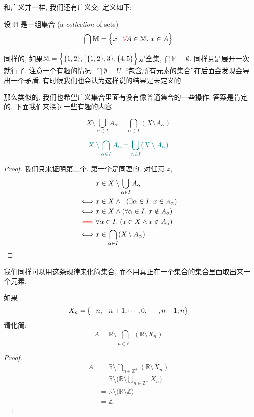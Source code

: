 和广义并一样, 我们还有广义交. 定义如下: 
\begin{definition}
  设 $\mathbb{M}$ 是一组集合 (a {\it collection} of sets)
  \[
    \bigcap \mathbb{M} = \Big\{x \mid \textcolor{red}{\forall} A \in \mathbb{M}.\; x \in A\Big\}
  \]
\end{definition}

同样的, 如果$\mathbb{M} = \Big\{\{1, 2\}, \{\{1, 2\}, 3\}, \{4, 5\}\Big\}$是全集,  $\bigcap \mathbb{M} = \emptyset$. 同样只是展开一次就行了. 注意一个有趣的情况: $\bigcap \emptyset =U$. ``包含所有元素的集合''在后面会发现会导出一个矛盾, 有时候我们也会认为这样说的结果是未定义的. 

那么类似的, 我们也希望广义集合里面有没有像普通集合的一些操作. 答案是肯定的. 下面我们来探讨一些有趣的内容. 

\begin{theorem}[德摩根律]
  \[
    X \setminus \bigcup_{\alpha \in I} A_{\alpha} = \bigcap_{\alpha \in I} (X \setminus A_{\alpha})
  \]

  \[
    \textcolor{teal}{X \setminus \bigcap_{\alpha \in I} A_{\alpha} = \bigcup_{\alpha \in I} (X \setminus A_{\alpha})}
  \]
\end{theorem}

\begin{proof}
  我们只来证明第二个. 第一个是同理的. 对任意 $x$,
  \setcounter{equation}{0}
  \begin{align*}
    &x \in X \setminus \bigcup_{\alpha \in I} A_{\alpha} \\
    \iff & x \in X \land \lnot(\exists \alpha \in I.\; x \in A_{\alpha}) \\
    \iff & x \in X \land (\forall \alpha \in I.\; x \notin A_{\alpha}) \\
    \textcolor{red}{\iff} & \forall \alpha \in I.\; (x \in X \land x \notin A_{\alpha}) \\
    \iff & x \in \bigcap_{\alpha \in I} (X \setminus A_{\alpha})
  \end{align*}
\end{proof}

我们同样可以用这条规律来化简集合, 而不用真正在一个集合的集合里面取出来一个元素. 

\begin{eg}
  如果
  \[
    X_n = \{-n, -n+1, \cdots, 0, \cdots, n-1, n\}
  \]
  请化简: 
  $$A = \mathbb{R} \setminus \bigcap_{n \in \mathbb{Z}^{+}} (\mathbb{R} \setminus X_n) $$
\end{eg}
\begin{proof}
  \begin{align*}
    A &= \mathbb{R} \setminus \bigcap_{n \in \mathbb{Z}^{+}} (\mathbb{R} \setminus X_n) \\
    &= \mathbb{R} \setminus \Big(\mathbb{R} \setminus \bigcup_{n \in \mathbb{Z}^{+}} X_n \Big) \\
    &= \mathbb{R} \setminus \Big(\mathbb{R} \setminus \mathbb{Z} \Big) \\
    &= \mathbb{Z}
  \end{align*}
\end{proof}

